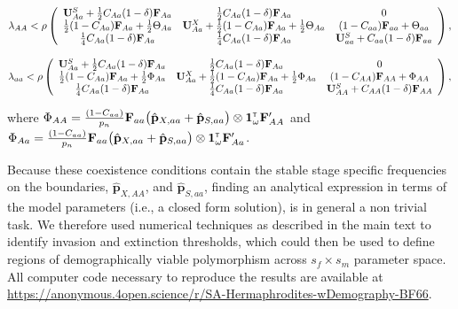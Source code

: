 \documentclass[11pt]{article}
\def\mbf#1{\mathbf{#1}}
\newcommand{\tr}{{\mbox{\tiny \sf T}}}
\begin{document}
{\footnotesize
\begin{equation} \label{eq:coexist_AA}
	\lambda_{AA} < 
			\rho\left(\begin{array}{ccc}
\mathbf{U}^S_{Aa} +\frac{1}{2} C_{Aa} (1 - \delta) \mbf{F}_{Aa} & \frac{1}{2} C_{Aa} (1 - \delta) \mbf{F}_{Aa}  & 0 \\
 \frac{1}{2} (1 - C_{Aa}) \mbf{F}_{Aa}+\frac{1}{2}  \Theta_{Aa} &\mathbf{U}^X_{Aa} + \frac{1}{2} (1 - C_{Aa}) \mbf{F}_{Aa} +\frac{1}{2}\Theta_{Aa} & (1-C_{aa})\mbf{F}_{aa} + \Theta_{aa}\\
  \frac{1}{4} C_{Aa} (1 - \delta) \mbf{F}_{Aa} & \frac{1}{4} C_{Aa} (1 - \delta) \mbf{F}_{Aa}  &\mathbf{U}^S_{aa} +C_{aa} (1 - \delta) \mbf{F}_{aa}  \\ 
			\end{array} \right), \\ 
\end{equation} 


\begin{equation} \label{eq:coexist_aa}
	\lambda_{aa} < 
			\rho\left(\begin{array}{ccc}
\mathbf{U}^S_{Aa} +\frac{1}{2} C_{Aa} (1 - \delta) \mbf{F}_{Aa} & \frac{1}{2} C_{Aa} (1 - \delta) \mbf{F}_{Aa}  & 0 \\
 \frac{1}{2} (1 - C_{Aa}) \mbf{F}_{Aa}+\frac{1}{2 } \Phi_{Aa} &\mathbf{U}^X_{Aa} + \frac{1}{2} (1 - C_{Aa}) \mbf{F}_{Aa} +\frac{1}{2} \Phi_{Aa} & (1-C_{AA})\mbf{F}_{AA} + \Phi_{AA}\\
  \frac{1}{4} C_{Aa} (1 - \delta) \mbf{F}_{Aa} & \frac{1}{4} C_{Aa} (1 - \delta) \mbf{F}_{Aa}  &\mathbf{U}^S_{AA} + C_{AA} (1 - \delta) \mbf{F}_{AA}  \\ 
			\end{array} \right), \\ 
\end{equation} 
}
where $\Phi_{AA} = \frac{(1 - C_{aa})}{p_{n}} \mbf{F}_{aa} \big(\hat{\mbf{p}}_{X,aa}+ \hat{\mbf{p}}_{S,aa}  \big) \otimes \mathbf{1}^\tr_{\omega} \mathbf{F}_{AA}^\prime$  and $\Phi_{Aa}=\frac{(1 - C_{aa})}{p_{n}} \mbf{F}_{aa} \big(\hat{\mbf{p}}_{X,aa}+ \hat{\mbf{p}}_{S,aa}  \big) \otimes \mathbf{1}^\tr_{\omega} \mathbf{F}_{Aa}^\prime$.

Because these coexistence conditions contain the stable stage specific frequencies on the boundaries, $\hat{\mbf{p}}_{X,AA}$, and $\hat{\mbf{p}}_{S,aa}$, finding an analytical expression in terms of the model parameters (i.e., a closed form solution),  is in general a non trivial task. We therefore used numerical techniques as described in the main text to identify invasion and extinction thresholds, which could then be used to define regions of demographically viable polymorphism across $s_f \times s_m$ parameter space. All computer code necessary to reproduce the results are available at \url{https://anonymous.4open.science/r/SA-Hermaphrodites-wDemography-BF66}.%
\end{document}
